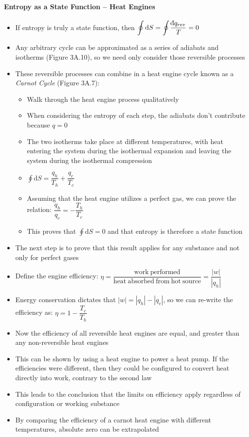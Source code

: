 \documentclass[12pt, openany, letterpaper]{memoir}
\begin{document}
\paragraph{Entropy as a State Function -- Heat Engines}
\begin{itemize}
	\item If entropy is truly a state function, then $\displaystyle\oint\mathrm{d}S = \displaystyle\oint\dfrac{\dbar q_{rev}}{T}=0$
	\item Any arbitrary cycle can be approximated as a series of adiabats and isotherms (Figure 3A.10), so we need only consider those reversible processes
	\item These reversible processes can combine in a heat engine cycle known as a \emph{Carnot Cycle} (Figure 3A.7):
	\begin{itemize}
		\item Walk through the heat engine process qualitatively
		\item When considering the entropy of each step, the adiabats don't contribute because $q=0$
		\item The two isotherms take place at different temperatures, with heat entering the system during the isothermal expansion and leaving the system during the isothermal compression
		\item $\displaystyle\oint\mathrm{d}S = \dfrac{q_h}{T_h} + \dfrac{q_c}{T_c}$
		\item Assuming that the heat engine utilizes a perfect gas, we can prove the relation: $\dfrac{q_h}{q_c} = -\dfrac{T_h}{T_c}$
		\item This proves that $\displaystyle\oint\mathrm{d}S = 0$ and that entropy is therefore a state function
	\end{itemize}
	\item The next step is to prove that this result applies for any substance and not only for perfect gases
	\item Define the engine efficiency: $\eta = \dfrac{\mathrm{work~performed}}{\mathrm{heat~absorbed~from~hot~source}} = \dfrac{|w|}{|q_h|}$
	\item Energy conservation dictates that $|w| = |q_h|-|q_c|$, so we can re-write the efficiency as: $\eta = 1 - \dfrac{T_c}{T_h}$
	\item Now the efficiency of all reversible heat engines are equal, and greater than any non-reversible heat engines
	\item This can be shown by using a heat engine to power a heat pump. If the efficiencies were different, then they could be configured to convert heat directly into work, contrary to the second law
	\item This leads to the conclusion that the limits on efficiency apply regardless of configuration or working substance
	\item By comparing the efficiency of a carnot heat engine with different temperatures, absolute zero can be extrapolated
	

\end{itemize}
\end{document}
